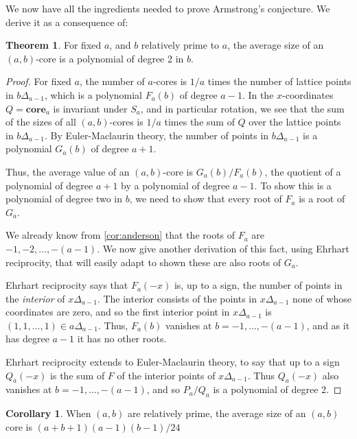 \documentclass{amsart}[12pt]
\theoremstyle{definition}
\newtheorem{theorem}[dummy]{Theorem}
\newtheorem{corollary}[dummy]{Corollary}
\newcommand{\core}{\mathbf{core}}
\begin{document}
We now have all the ingredients needed to prove Armstrong's conjecture.  We derive it as a consequence of:

\begin{theorem} \label{thm:polynomial}
For fixed $a$, and $b$ relatively prime to $a$,  the average size of an $(a,b)$-core is a polynomial of degree 2 in $b$.
\end{theorem}

\begin{proof}
For fixed $a$, the number of $a$-cores is $1/a$ times the
number of lattice points in $b\Delta_{a-1}$, which is a polynomial
$F_a(b)$ of degree $a-1$.  In the $x$-coordinates $Q=\core_a$
is invariant under $S_a$, and in particular rotation, we see that the sum of the sizes of all $(a,b)$-cores is $1/a$ times the sum of $Q$ over the lattice points in $b\Delta_{a-1}$.   By Euler-Maclaurin theory, the number of points in $b\Delta_{a-1}$ is a polynomial $G_a(b)$ of degree $a+1$.

Thus, the average value of an $(a,b)$-core is $G_a(b)/F_a(b)$, the quotient of a polynomial of degree $a+1$ by a polynomial of degree $a-1$.  To show this is a polynomial of degree two in $b$, we need to show that every root of $F_a$ is a root of $G_a$.

We already know from \ref{cor:anderson} that the roots of $F_a$ are $-1,
-2,\dots, -(a-1)$.  We now give another derivation of this fact, using Ehrhart reciprocity, that will easily adapt to shown these are also roots of $G_a$. 

Ehrhart reciprocity says that $F_a(-x)$ is, up to a sign, the number of
points in the \emph{interior} of $x\Delta_{a-1}$.  The interior
consists of the points in $x\Delta_{a-1}$ none of whose coordinates
are zero, and so the first interior point in $x\Delta_{a-1}$ is  $(1,1,\dots,1)\in a\Delta_{a-1}$.   Thus, $F_a(b)$ vanishes at $b=-1,\dots, -(a-1)$, and as it has degree $a-1$ it has no other roots.

Ehrhart reciprocity extends to Euler-Maclaurin theory, to say that up to a sign $Q_a(-x)$ is the sum of $F$ of the interior points of
$x\Delta_{a-1}$. Thus $Q_a(-x)$ also vanishes at
$b=-1,\dots,-(a-1)$, and so $P_a/Q_a$ is a polynomial of degree 2.

\end{proof}


\begin{corollary} \label{cor:averagesize}
When $(a,b)$ are relatively prime, the average size of an $(a,b)$ core is $(a+b+1)(a-1)(b-1)/24$
\end{corollary}
\end{document}
